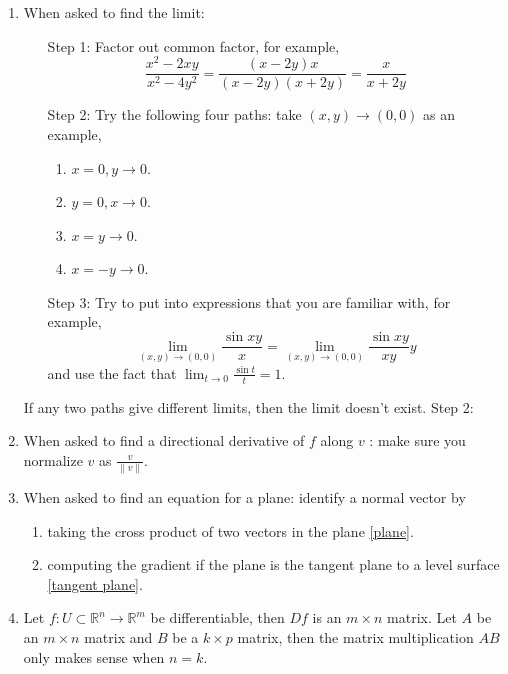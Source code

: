 \documentclass[openany]{book}
\newcommand{\R}{\mathbb{R}}
\begin{document}
\begin{enumerate}
    \item When asked to find the limit: 
    \begin{enumerate}
        \item[Step 1:] Factor out common factor, for example,
        \begin{equation*}
            \frac{x^2-2xy}{x^2-4y^2}=\frac{(x-2y)x}{(x-2y)(x+2y)}=\frac{x}{x+2y}
        \end{equation*}
        \item[Step 2:] Try the following four paths: take $(x,y)\to (0,0)$ as an example,
        \begin{enumerate}
            \item $x=0, y\to 0$.
            \item $y=0, x\to 0$.
            \item $x=y\to 0$.
            \item $x=-y\to 0$.
        \end{enumerate}
        \item[Step 3:] Try to put into expressions that you are familiar with, for example, 
        \begin{equation*}
            \lim_{(x,y)\to(0,0)}\frac{\sin xy}{x}=\lim_{(x,y)\to(0,0)}\frac{\sin xy}{xy}y
        \end{equation*}
        and use the fact that $\lim_{t\to 0}\frac{\sin t}{t}=1$.
    \end{enumerate}
   
    If any two paths give different limits, then the limit doesn't exist. Step 2: 
    \item When asked to find a directional derivative of $f$ along $v$ : make sure you normalize $v$ as $\frac{v}{\|v\|}$.
    \item When asked to find an equation for a plane: identify a normal vector by
    \begin{enumerate}
        \item taking the cross product of two vectors in the plane \ref{plane}.
        \item computing the gradient if the plane is the tangent plane to a level surface \ref{tangent plane}.
    \end{enumerate}
    \item Let $f:U\subset\R^n\to\R^m$ be differentiable, then $Df$ is an $m\times n$ matrix. Let $A$ be an $m\times n$ matrix and $B$ be a $k\times p$ matrix, then the matrix multiplication $AB$ only makes sense when $n=k$.
\end{enumerate}
\end{document}
